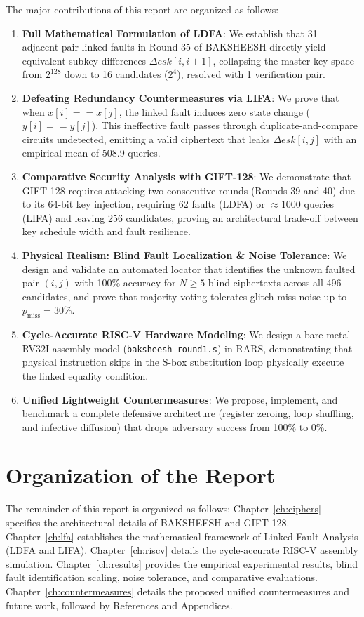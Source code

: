 \documentclass[12pt,a4paper,oneside]{report}
\begin{document}
The major contributions of this report are organized as follows:
\begin{enumerate}
    \item \textbf{Full Mathematical Formulation of LDFA}: We establish that 31 adjacent-pair linked faults in Round 35 of BAKSHEESH directly yield equivalent subkey differences $\Delta esk[i, i+1]$, collapsing the master key space from $2^{128}$ down to 16 candidates ($2^4$), resolved with 1 verification pair.
    \item \textbf{Defeating Redundancy Countermeasures via LIFA}: We prove that when $x[i] == x[j]$, the linked fault induces zero state change ($y[i] == y[j]$). This ineffective fault passes through duplicate-and-compare circuits undetected, emitting a valid ciphertext that leaks $\Delta esk[i, j]$ with an empirical mean of 508.9 queries.
    \item \textbf{Comparative Security Analysis with GIFT-128}: We demonstrate that GIFT-128 requires attacking two consecutive rounds (Rounds 39 and 40) due to its 64-bit key injection, requiring 62 faults (LDFA) or $\approx 1000$ queries (LIFA) and leaving 256 candidates, proving an architectural trade-off between key schedule width and fault resilience.
    \item \textbf{Physical Realism: Blind Fault Localization \& Noise Tolerance}: We design and validate an automated locator that identifies the unknown faulted pair $(i, j)$ with 100\% accuracy for $N \ge 5$ blind ciphertexts across all 496 candidates, and prove that majority voting tolerates glitch miss noise up to $p_{\text{miss}} = 30\%$.
    \item \textbf{Cycle-Accurate RISC-V Hardware Modeling}: We design a bare-metal RV32I assembly model (\texttt{baksheesh\_round1.s}) in RARS, demonstrating that physical instruction skips in the S-box substitution loop physically execute the linked equality condition.
    \item \textbf{Unified Lightweight Countermeasures}: We propose, implement, and benchmark a complete defensive architecture (register zeroing, loop shuffling, and infective diffusion) that drops adversary success from 100\% to 0\%.
\end{enumerate}

\section{Organization of the Report}
\label{sec:organization}
The remainder of this report is organized as follows: Chapter~\ref{ch:ciphers} specifies the architectural details of BAKSHEESH and GIFT-128. Chapter~\ref{ch:lfa} establishes the mathematical framework of Linked Fault Analysis (LDFA and LIFA). Chapter~\ref{ch:riscv} details the cycle-accurate RISC-V assembly simulation. Chapter~\ref{ch:results} provides the empirical experimental results, blind fault identification scaling, noise tolerance, and comparative evaluations. Chapter~\ref{ch:countermeasures} details the proposed unified countermeasures and future work, followed by References and Appendices.
\end{document}
